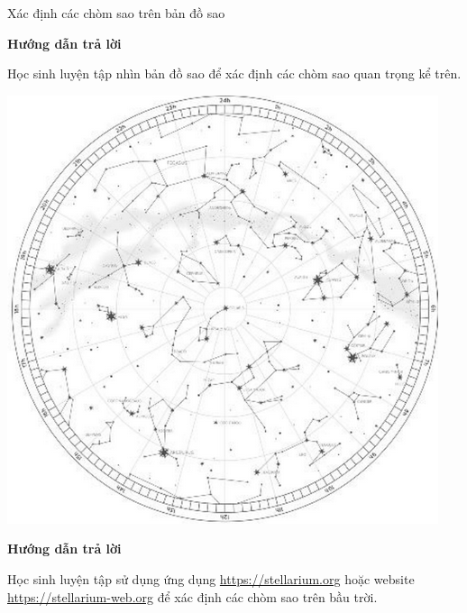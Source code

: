 \begin{dang}{Xác định các chòm sao trên bản đồ sao}
	{	\begin{center}
			\textbf{Hướng dẫn trả lời}
		\end{center}
		
		Học sinh luyện tập nhìn bản đồ sao để xác định các chòm sao quan trọng kể trên.
		\begin{center}
			\includegraphics[scale=0.8]{../figs/G10-034-8}
		\end{center}
		
	}
	{	\begin{center}
			\textbf{Hướng dẫn trả lời}
		\end{center}
		
		Học sinh luyện tập sử dụng ứng dụng \url{https://stellarium.org} hoặc website \url{https://stellarium-web.org} để xác định các chòm sao trên bầu trời.
	}
\end{dang}
